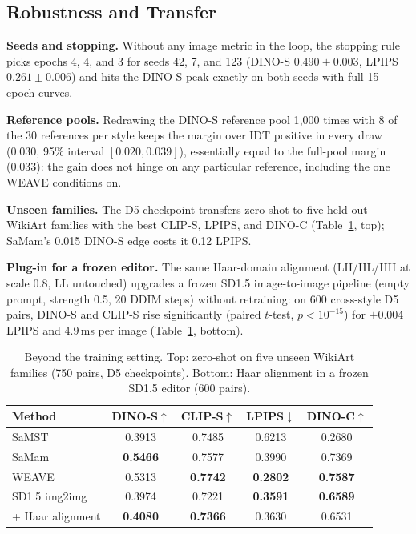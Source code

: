 \documentclass[conference]{IEEEtran}
\newcommand{\dinos}{DINO-S}
\newcommand{\dinoc}{DINO-C}
\newcommand{\clips}{CLIP-S}
\begin{document}
\subsection{Robustness and Transfer}
\noindent\textbf{Seeds and stopping.} Without any image metric in the loop, the stopping rule picks epochs
4, 4, and 3 for seeds 42, 7, and 123 (\dinos{} $0.490\pm0.003$, LPIPS $0.261\pm0.006$) and hits the
\dinos{} peak exactly on both seeds with full 15-epoch curves.

\noindent\textbf{Reference pools.} Redrawing the \dinos{} reference pool 1{,}000 times with 8 of the 30
references per style keeps the margin over IDT positive in every draw (0.030, 95\% interval
$[0.020,0.039]$), essentially equal to the full-pool margin (0.033): the gain does not hinge on any
particular reference, including the one WEAVE conditions on.

\noindent\textbf{Unseen families.} The D5 checkpoint transfers zero-shot to five held-out WikiArt families
with the best \clips{}, LPIPS, and \dinoc{} (Table~\ref{tab:transfer}, top); SaMam's 0.015 \dinos{} edge
costs it 0.12 LPIPS.

\noindent\textbf{Plug-in for a frozen editor.} The same Haar-domain alignment (LH/HL/HH at scale 0.8, LL
untouched) upgrades a frozen SD1.5 image-to-image pipeline (empty prompt, strength 0.5, 20 DDIM steps)
without retraining: on 600 cross-style D5 pairs, \dinos{} and \clips{} rise significantly (paired $t$-test,
$p<10^{-15}$) for $+$0.004 LPIPS and 4.9\,ms per image (Table~\ref{tab:transfer}, bottom).

\begin{table}[t]
\centering
\caption{Beyond the training setting. Top: zero-shot on five unseen WikiArt families (750 pairs, D5
checkpoints). Bottom: Haar alignment in a frozen SD1.5 editor (600 pairs).}
\label{tab:transfer}
\footnotesize
\setlength{\tabcolsep}{4pt}
\begin{tabular}{@{}lcccc@{}}
\toprule
Method & \dinos$\uparrow$ & \clips$\uparrow$ & LPIPS$\downarrow$ & \dinoc$\uparrow$ \\
\midrule
SaMST & 0.3913 & 0.7485 & 0.6213 & 0.2680 \\
SaMam & \textbf{0.5466} & 0.7577 & 0.3990 & 0.7369 \\
WEAVE & 0.5313 & \textbf{0.7742} & \textbf{0.2802} & \textbf{0.7587} \\
\midrule
SD1.5 img2img & 0.3974 & 0.7221 & \textbf{0.3591} & \textbf{0.6589} \\
\;+ Haar alignment & \textbf{0.4080} & \textbf{0.7366} & 0.3630 & 0.6531 \\
\bottomrule
\end{tabular}
\end{table}
\end{document}
